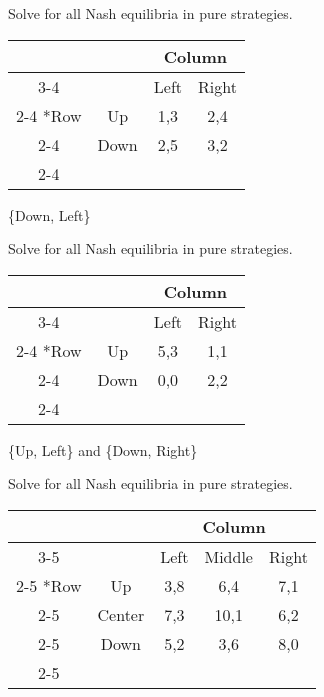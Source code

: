 \documentclass[addpoints]{exam}
\begin{document}
\begin{questions}
\begin{parts}
\begin{solution}
  \end{solution}
\end{parts}

\newpage
\question[4]
Solve for all Nash equilibria in pure strategies.

\begin{table}[h!]
  \centering
  \setlength{\extrarowheight}{2pt}
  \begin{tabular}{*{4}{c|}}
    \multicolumn{2}{c}{} & \multicolumn{2}{c}{Column} \\\cline{3-4}
    \multicolumn{1}{c}{} &      & Left & Right \\\cline{2-4}
    \multirow{2}*{Row}   & Up   & 1,3  & 2,4   \\\cline{2-4}
                         & Down & 2,5  & 3,2   \\\cline{2-4}
  \end{tabular}
\end{table}

\begin{solution}
  \{Down, Left\}
\end{solution}

\question[4]
Solve for all Nash equilibria in pure strategies.

\begin{table}[h!]
  \centering
  \setlength{\extrarowheight}{2pt}
  \begin{tabular}{*{4}{c|}}
    \multicolumn{2}{c}{} & \multicolumn{2}{c}{Column} \\\cline{3-4}
    \multicolumn{1}{c}{} &      & Left & Right \\\cline{2-4}
    \multirow{2}*{Row}   & Up   & 5,3  & 1,1   \\\cline{2-4}
                         & Down & 0,0  & 2,2   \\\cline{2-4}
  \end{tabular}
\end{table}

\begin{solution}
  \{Up, Left\} and \{Down, Right\}
\end{solution}

\question[4]
Solve for all Nash equilibria in pure strategies.
\begin{table}[h!]
  \centering
  \setlength{\extrarowheight}{2pt}
  \begin{tabular}{*{5}{c|}}
    \multicolumn{2}{c}{} & \multicolumn{3}{c}{Column} \\\cline{3-5}
    \multicolumn{1}{c}{} &        & Left & Middle & Right \\\cline{2-5}
    \multirow{3}*{Row}   & Up     & 3,8 & 6,4 & 7,1 \\\cline{2-5}
                         & Center & 7,3 & 10,1 & 6,2 \\\cline{2-5}
                         & Down   & 5,2 & 3,6 & 8,0 \\\cline{2-5}
  \end{tabular}
\end{table}


\end{questions}
\end{document}
